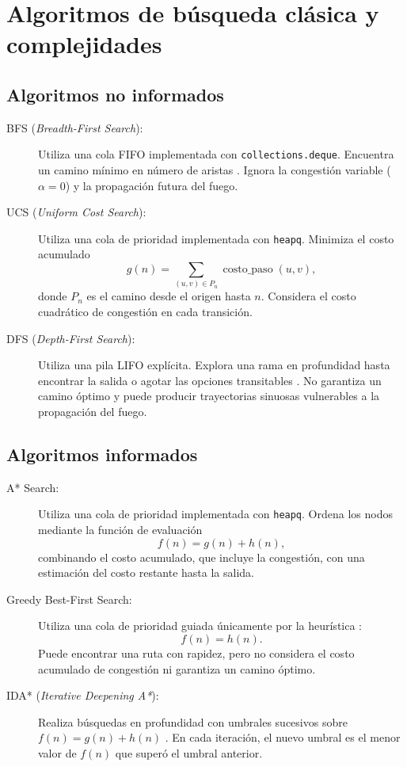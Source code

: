 \documentclass[11pt,letterpaper]{article}
\begin{document}
\newpage
\section{Algoritmos de búsqueda clásica y complejidades}

\subsection{Algoritmos no informados}

\begin{description}
    \item[BFS (\textit{Breadth-First Search}):] Utiliza una cola FIFO implementada con \texttt{collections.deque}. Encuentra un camino mínimo en número de aristas \cite{cormen2009, russell2020}. Ignora la congestión variable ($\alpha=0$) y la propagación futura del fuego.

    \item[UCS (\textit{Uniform Cost Search}):] Utiliza una cola de prioridad implementada con \texttt{heapq}. Minimiza el costo acumulado \cite{dijkstra1959, russell2020}
    \[
        g(n)=\sum_{(u,v)\in P_n}\operatorname{costo\_paso}(u,v),
    \]
    donde $P_n$ es el camino desde el origen hasta $n$. Considera el costo cuadrático de congestión en cada transición.

    \item[DFS (\textit{Depth-First Search}):] Utiliza una pila LIFO explícita. Explora una rama en profundidad hasta encontrar la salida o agotar las opciones transitables \cite{cormen2009}. No garantiza un camino óptimo y puede producir trayectorias sinuosas vulnerables a la propagación del fuego.
\end{description}

\subsection{Algoritmos informados}

\begin{description}
    \item[A* Search:] Utiliza una cola de prioridad implementada con \texttt{heapq}. Ordena los nodos mediante la función de evaluación \cite{hart1968, russell2020}
    \[
        f(n)=g(n)+h(n),
    \]
    combinando el costo acumulado, que incluye la congestión, con una estimación del costo restante hasta la salida.

    \item[Greedy Best-First Search:] Utiliza una cola de prioridad guiada únicamente por la heurística \cite{russell2020}:
    \[
        f(n)=h(n).
    \]
    Puede encontrar una ruta con rapidez, pero no considera el costo acumulado de congestión ni garantiza un camino óptimo.

    \item[IDA* (\textit{Iterative Deepening A*}):] Realiza búsquedas en profundidad con umbrales sucesivos sobre $f(n)=g(n)+h(n)$ \cite{korf1985}. En cada iteración, el nuevo umbral es el menor valor de $f(n)$ que superó el umbral anterior.
\end{description}
\end{document}
